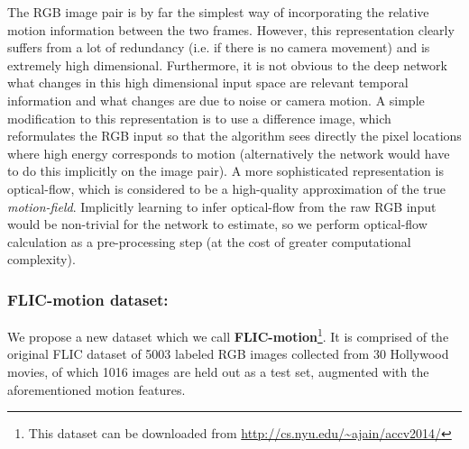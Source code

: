 The RGB image pair is by far the simplest way of incorporating the relative motion information between the two frames.  However, this representation clearly suffers from a lot of redundancy (i.e. if there is no camera movement) and is extremely high dimensional.  Furthermore, it is not obvious to the deep network what changes in this high dimensional input space are relevant temporal information and what changes are due to noise or camera motion. A simple modification to this representation is to use a difference image, which reformulates the RGB input so that the algorithm sees directly the pixel locations where high energy corresponds to motion (alternatively the network would have to do this implicitly on the image pair).  A more sophisticated representation is optical-flow, which is considered to be a high-quality approximation of the true \emph{motion-field}. Implicitly learning to infer optical-flow from the raw RGB input would be non-trivial for the network to estimate, so we perform optical-flow calculation as a pre-processing step (at the cost of greater computational complexity).

\subsubsection{FLIC-motion dataset:}
\label{sec:FLICmotion}
We propose a new dataset which we call {\bf FLIC-motion}\footnote{This dataset can be downloaded from \url{http://cs.nyu.edu/~ajain/accv2014/}}. It is comprised of the original FLIC dataset of 5003 labeled RGB images collected from 30 Hollywood movies, of which 1016 images are held out as a test set, augmented with the aforementioned motion features.

